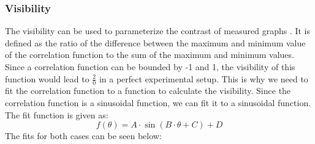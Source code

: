 \subsubsection{Visibility}
The visibility can be used to parameterize the contrast of measured graphs \cite{manual}. It is defined as the ratio of the difference between the maximum and minimum value of the correlation function to the sum of the maximum and minimum values.
Since a correlation function can be bounded by -1 and 1, the visibility of this function would lead to $\frac{2}{0}$ in a perfect experimental setup. This is why we need to fit the correlation function to a function to calculate the visibility. Since the correlation function is a sinusoidal function, we can fit it to a sinusoidal function. The fit function is given as:
\begin{equation}
    f(\theta) = A \cdot \sin(B \cdot \theta + C) + D
\end{equation}
The fits for both cases can be seen below:
